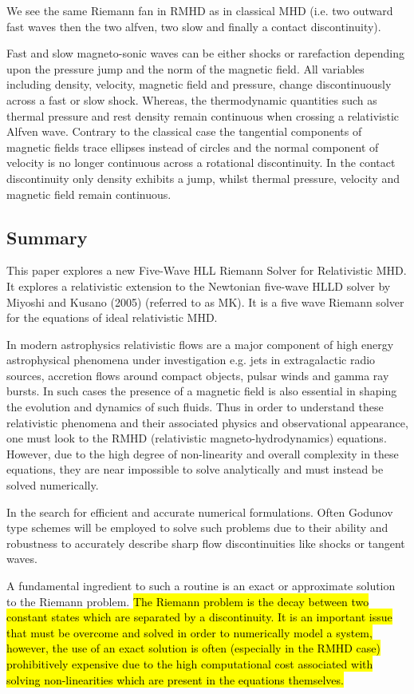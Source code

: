 \documentclass{article}
\begin{document}
We see the same Riemann fan in RMHD as in classical MHD (i.e. two outward fast waves then the two alfven, two slow and finally a contact discontinuity). 

Fast and slow magneto-sonic waves can be either shocks or rarefaction depending upon the pressure jump and the norm of the magnetic field. All variables including density, velocity, magnetic field and pressure, change discontinuously across a fast or slow shock. Whereas, the thermodynamic quantities such as thermal pressure and rest density remain continuous when crossing a relativistic Alfven wave. Contrary to the classical case the tangential components of magnetic fields trace ellipses instead of circles and the normal component of velocity is no longer continuous across a rotational discontinuity. In the contact discontinuity only density exhibits a jump, whilst thermal pressure, velocity and magnetic field remain continuous. 


\subsection{Summary}

This paper explores a new Five-Wave HLL Riemann Solver for Relativistic MHD. It explores a relativistic extension to the Newtonian five-wave HLLD solver by Miyoshi and Kusano (2005) (referred to as MK). It is a five wave Riemann solver for the equations of ideal relativistic MHD.

In modern astrophysics relativistic flows are a major component of high energy astrophysical phenomena under investigation e.g. jets in extragalactic radio sources, accretion flows around compact objects, pulsar winds and gamma ray bursts. In such cases the presence of a magnetic field is also essential in shaping the evolution and dynamics of such fluids. Thus in order to understand these relativistic phenomena and their associated physics and observational appearance, one must look to the RMHD (relativistic magneto-hydrodynamics) equations. However, due to the high degree of non-linearity and overall complexity in these equations, they are near impossible to solve analytically and must instead be solved numerically. 

In the search for efficient and accurate numerical formulations. Often Godunov type schemes will be employed to solve such problems due to their ability and robustness to accurately describe sharp flow discontinuities like shocks or tangent waves.  

A fundamental ingredient to such a routine is an exact or approximate solution to the Riemann problem. \hl{The Riemann problem is the decay between two constant states which are separated by a discontinuity. It is an important issue that must be overcome and solved in order to numerically model a system, however, the use of an exact solution is often (especially in the RMHD case) prohibitively expensive due to the high computational cost associated with solving non-linearities which are present in the equations themselves. }
\end{document}
